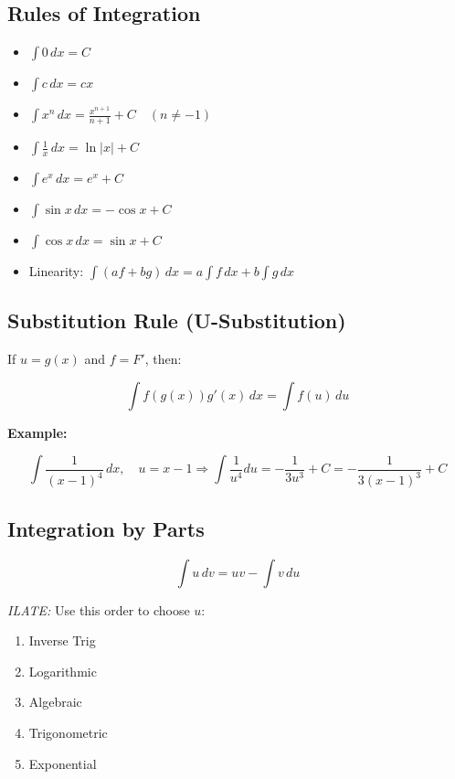 \subsection{Rules of Integration}

\begin{itemize}

    \item \(\int 0\,dx = C\)

    \item \(\int c\,dx = cx\)

    \item \(\int x^n\,dx = \frac{x^{n+1}}{n+1} + C \quad (n \ne -1)\)

    \item \(\int \frac{1}{x}\,dx = \ln|x| + C\)

    \item \(\int e^x\,dx = e^x + C\)

    \item \(\int \sin x\,dx = -\cos x + C\)

    \item \(\int \cos x\,dx = \sin x + C\)

    \item Linearity: \(\int (af + bg)\,dx = a\int f\,dx + b\int g\,dx\)

\end{itemize}

\subsection{Substitution Rule (U-Substitution)}

If \(u = g(x)\) and \(f = F'\), then:

\[
    \int f(g(x))g'(x)\,dx = \int f(u)\,du
\]

\textbf{Example:}

\[
    \int \frac{1}{{(x - 1)}^4}\,dx, \quad u = x - 1 \Rightarrow \int \frac{1}{u^4} du = -\frac{1}{3u^3} + C = -\frac{1}{3{(x - 1)}^3} + C
\]

\subsection{Integration by Parts}

\[
    \int u\,dv = uv - \int v\,du
\]

\emph{ILATE:} Use this order to choose \(u\):

\begin{enumerate}

    \item Inverse Trig

    \item Logarithmic

    \item Algebraic

    \item Trigonometric

    \item Exponential

\end{enumerate}

